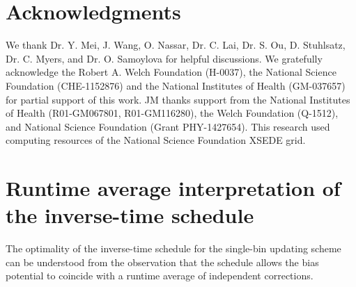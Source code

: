 \documentclass[preprint, superscriptaddress, floatfix]{revtex4-1}
\begin{document}
\section{Acknowledgments}

We thank Dr. Y. Mei, J. Wang,
O. Nassar, Dr. C. Lai, Dr. S. Ou, D. Stuhlsatz,
Dr. C. Myers, and Dr. O. Samoylova
for helpful discussions.
%
We gratefully acknowledge the Robert A. Welch Foundation (H-0037),
the National Science Foundation (CHE-1152876)
and the National Institutes of Health (GM-037657)
for partial support of this work.
%
JM thanks support from the National Institutes of Health
(R01-GM067801, R01-GM116280),
the Welch Foundation (Q-1512),
and National Science Foundation (Grant PHY-1427654).
%
This research used computing resources of
the National Science Foundation XSEDE grid.
%


\appendix




\section{\label{sec:equilerr}
Runtime average interpretation
of the inverse-time schedule
}



The optimality of the inverse-time schedule
for the single-bin updating scheme
can be understood from the observation that
the schedule allows the bias potential
to coincide with a runtime average
of independent corrections.
\end{document}
